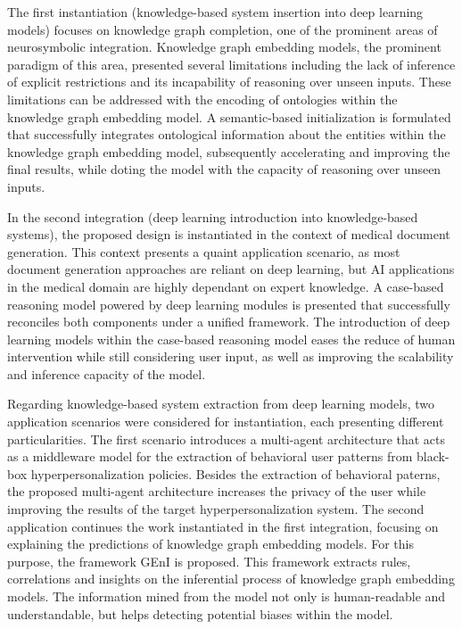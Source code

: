 The first instantiation (knowledge-based system insertion into deep learning models) focuses on knowledge graph completion, one of the prominent areas of neurosymbolic integration. Knowledge graph embedding models, the prominent paradigm of this area, presented several limitations including the lack of inference of explicit restrictions and its incapability of reasoning over unseen inputs. These limitations can be addressed with the encoding of ontologies within the knowledge graph embedding model. A semantic-based initialization is formulated that successfully integrates ontological information about the entities within the knowledge graph embedding model, subsequently accelerating and improving the final results, while doting the model with the capacity of reasoning over unseen inputs.

In the second integration (deep learning introduction into knowledge-based systems), the proposed design is instantiated in the context of medical document generation. This context presents a quaint application scenario, as most document generation approaches are reliant on deep learning, but AI applications in the medical domain are highly dependant on expert knowledge. A case-based reasoning model powered by deep learning modules is presented that successfully reconciles both components under a unified framework. The introduction of deep learning models within the case-based reasoning model eases the reduce of human intervention while still considering user input, as well as improving the scalability and inference capacity of the model. 

Regarding knowledge-based system extraction from deep learning models, two application scenarios were considered for instantiation, each presenting different particularities. The first scenario introduces a multi-agent architecture that acts as a middleware model for the extraction of behavioral user patterns from black-box hyperpersonalization policies. Besides the extraction of behavioral paterns, the proposed multi-agent architecture increases the privacy of the user while improving the results of the target hyperpersonalization system. The second application continues the work instantiated in the first integration, focusing on explaining the predictions of knowledge graph embedding models. For this purpose, the framework GEnI is proposed. This framework extracts rules, correlations and insights on the inferential process of knowledge graph embedding models. The information mined from the model not only is human-readable and understandable, but helps detecting potential biases within the model. 

